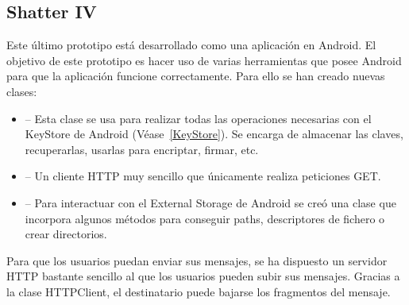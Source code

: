 \subsection{Shatter IV}


Este último prototipo está desarrollado como una aplicación en Android. El
objetivo de este prototipo es hacer uso de varias herramientas que posee Android
para que la aplicación funcione correctamente. Para ello se han creado nuevas
clases:

\begin{itemize}
  \item {} -- Esta clase se usa para realizar todas las
  operaciones necesarias con el KeyStore de Android (Véase~\ref{KeyStore}). Se
  encarga de almacenar las claves, recuperarlas, usarlas para encriptar,
  firmar, etc.

  \item {} -- Un cliente HTTP muy sencillo que únicamente
  realiza peticiones GET.

  \item {} -- Para interactuar con el External Storage de
  Android se creó una clase que incorpora algunos métodos para conseguir paths,
  descriptores de fichero o crear directorios.
\end{itemize}


Para que los usuarios puedan enviar sus mensajes, se ha dispuesto un servidor
HTTP bastante sencillo al que los usuarios pueden subir sus mensajes. Gracias a
la clase HTTPClient, el destinatario puede bajarse los fragmentos del mensaje.


